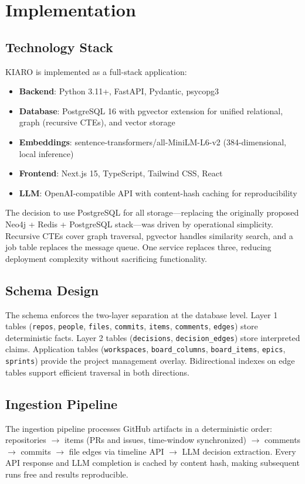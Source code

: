 \documentclass[conference]{IEEEtran}
\begin{document}
\section{Implementation}
\label{sec:implementation}

\subsection{Technology Stack}
KIARO is implemented as a full-stack application:
\begin{itemize}
    \item \textbf{Backend}: Python 3.11+, FastAPI, Pydantic, psycopg3
    \item \textbf{Database}: PostgreSQL 16 with pgvector extension for unified relational, graph (recursive CTEs), and vector storage
    \item \textbf{Embeddings}: sentence-transformers/all-MiniLM-L6-v2 (384-dimensional, local inference)
    \item \textbf{Frontend}: Next.js 15, TypeScript, Tailwind CSS, React
    \item \textbf{LLM}: OpenAI-compatible API with content-hash caching for reproducibility
\end{itemize}

The decision to use PostgreSQL for all storage---replacing the originally proposed Neo4j + Redis + PostgreSQL stack---was driven by operational simplicity. Recursive CTEs cover graph traversal, pgvector handles similarity search, and a job table replaces the message queue. One service replaces three, reducing deployment complexity without sacrificing functionality.

\subsection{Schema Design}
The schema enforces the two-layer separation at the database level. Layer 1 tables (\texttt{repos}, \texttt{people}, \texttt{files}, \texttt{commits}, \texttt{items}, \texttt{comments}, \texttt{edges}) store deterministic facts. Layer 2 tables (\texttt{decisions}, \texttt{decision\_edges}) store interpreted claims. Application tables (\texttt{workspaces}, \texttt{board\_columns}, \texttt{board\_items}, \texttt{epics}, \texttt{sprints}) provide the project management overlay. Bidirectional indexes on edge tables support efficient traversal in both directions.

\subsection{Ingestion Pipeline}
The ingestion pipeline processes GitHub artifacts in a deterministic order: repositories $\rightarrow$ items (PRs and issues, time-window synchronized) $\rightarrow$ comments $\rightarrow$ commits $\rightarrow$ file edges via timeline API $\rightarrow$ LLM decision extraction. Every API response and LLM completion is cached by content hash, making subsequent runs free and results reproducible.
\end{document}
